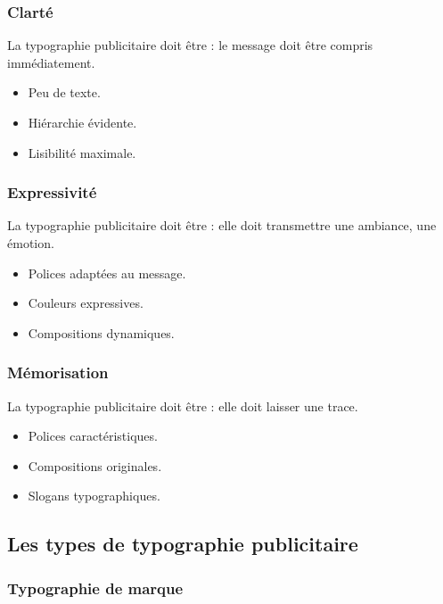 \subsubsection{Clarté}

La typographie publicitaire doit être  : le message doit être compris immédiatement.

\begin{itemize}
    \item Peu de texte.
    \item Hiérarchie évidente.
    \item Lisibilité maximale.
\end{itemize}

\subsubsection{Expressivité}

La typographie publicitaire doit être  : elle doit transmettre une ambiance, une émotion.

\begin{itemize}
    \item Polices adaptées au message.
    \item Couleurs expressives.
    \item Compositions dynamiques.
\end{itemize}

\subsubsection{Mémorisation}

La typographie publicitaire doit être  : elle doit laisser une trace.

\begin{itemize}
    \item Polices caractéristiques.
    \item Compositions originales.
    \item Slogans typographiques.
\end{itemize}

\subsection{Les types de typographie publicitaire}

\subsubsection{Typographie de marque}

